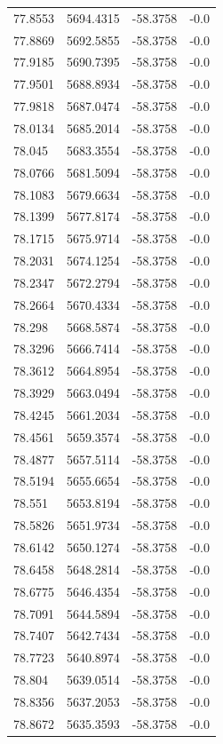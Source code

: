 \begin{table}[H]
\begin{tabular}{llll}
77.8553 & 5694.4315 & -58.3758 & -0.0 \\
77.8869 & 5692.5855 & -58.3758 & -0.0 \\
77.9185 & 5690.7395 & -58.3758 & -0.0 \\
77.9501 & 5688.8934 & -58.3758 & -0.0 \\
77.9818 & 5687.0474 & -58.3758 & -0.0 \\
78.0134 & 5685.2014 & -58.3758 & -0.0 \\
78.045 & 5683.3554 & -58.3758 & -0.0 \\
78.0766 & 5681.5094 & -58.3758 & -0.0 \\
78.1083 & 5679.6634 & -58.3758 & -0.0 \\
78.1399 & 5677.8174 & -58.3758 & -0.0 \\
78.1715 & 5675.9714 & -58.3758 & -0.0 \\
78.2031 & 5674.1254 & -58.3758 & -0.0 \\
78.2347 & 5672.2794 & -58.3758 & -0.0 \\
78.2664 & 5670.4334 & -58.3758 & -0.0 \\
78.298 & 5668.5874 & -58.3758 & -0.0 \\
78.3296 & 5666.7414 & -58.3758 & -0.0 \\
78.3612 & 5664.8954 & -58.3758 & -0.0 \\
78.3929 & 5663.0494 & -58.3758 & -0.0 \\
78.4245 & 5661.2034 & -58.3758 & -0.0 \\
78.4561 & 5659.3574 & -58.3758 & -0.0 \\
78.4877 & 5657.5114 & -58.3758 & -0.0 \\
78.5194 & 5655.6654 & -58.3758 & -0.0 \\
78.551 & 5653.8194 & -58.3758 & -0.0 \\
78.5826 & 5651.9734 & -58.3758 & -0.0 \\
78.6142 & 5650.1274 & -58.3758 & -0.0 \\
78.6458 & 5648.2814 & -58.3758 & -0.0 \\
78.6775 & 5646.4354 & -58.3758 & -0.0 \\
78.7091 & 5644.5894 & -58.3758 & -0.0 \\
78.7407 & 5642.7434 & -58.3758 & -0.0 \\
78.7723 & 5640.8974 & -58.3758 & -0.0 \\
78.804 & 5639.0514 & -58.3758 & -0.0 \\
78.8356 & 5637.2053 & -58.3758 & -0.0 \\
78.8672 & 5635.3593 & -58.3758 & -0.0 \\

\end{tabular}
\end{table}
